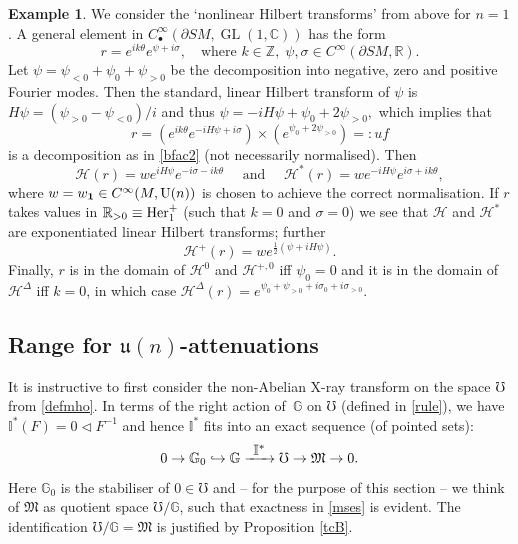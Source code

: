 \documentclass[JEP,XML,SOM,Unicode,published]{cedram}
\newcommand\To[1]{\mathchoice{\xrightarrow{\textstyle\kern4pt#1\kern3pt}}{\stackrel{#1}{\longrightarrow}}{}{}}
\newcommand\hto{\mathrel{\lhook\joinrel\to}}
\DeclareMathOperator{\GL}{GL}
\newcommand{\rU}{\mathrm{U}}
\theoremstyle{plain}
\theoremstyle{definition}
\newtheorem{example}[theorem]{Example}
\newcommand{\G}{\mathbb{G}}
\newcommand{\I}{\mathbb{I}}
\newcommand{\Z}{\mathbb{Z}}
\newcommand{\R}{\mathbb{R}}
\newcommand{\C}{\mathbb{C}}
\renewcommand{\H}{\mathcal{H}}
\newcommand{\M}{\mathfrak{M}}
\renewcommand{\u}{\mathfrak{u}}
\newcommand{\he}{\textup{Her}}
\newcommand{\1}{{\bf 1}}
\newcommand{\extend}{{\scriptscriptstyle\bullet}}
\let\act\triangleleft
\begin{document}
\begin{example} We consider the `nonlinear Hilbert transforms' from above for $n=1$. A general element in $C_\extend^\infty(\partial SM,\GL(1,\C))$ has the form
\begin{equation*}
r = e^{ik\theta} e^{\psi + i\sigma}, \quad\text{where } k\in \Z,\;\psi,\sigma\in C^\infty(\partial SM,\R).
\end{equation*}
Let $\psi=\psi_{<0}+ \psi_0+\psi_{>0}$ be the decomposition into negative, zero and positive Fourier modes. Then the standard, linear Hilbert transform of $\psi$ is
$
H\psi = (\psi_{>0}-\psi_{<0})/i
$
and thus
$
\psi = -iH\psi + \psi_0+2\psi_{>0},
$
which implies that
\begin{equation*}
r = \left(e^{ik \theta} e^{-iH\psi + i\sigma} \right) \times \left(e^{\psi_0+2\psi_{>0}}\right) =: uf
\end{equation*}
is a decomposition as in \eqref{bfac2} (not necessarily normalised). Then
\begin{equation*}
\H(r) = w e^{iH\psi} e^{-i\sigma - ik\theta}\quad \text{ and } \quad \H^*(r) = w e^{-iH\psi}e^{i\sigma + ik\theta},
\end{equation*}
where $w=w_\1\in C^\infty(M,\rU(n))$ is chosen to achieve the correct normalisation.
If $r$ takes values in $\R_{>0}\equiv \he^+_1$ (such that $k=0$ and $\sigma=0$) we see that $\H$ and $\H^*$ are exponentiated linear Hilbert transforms; further
\begin{equation*}
\H^+(r) = w e^{\frac{1}{2}(\psi + i H\psi)}.
\end{equation*}
Finally, $r$ is in the domain of $\H^0$ and $\H^{+,0}$ iff $\psi_0=0$ and it is in the domain of $\H^\Delta$ iff $k=0$, in which case $\H^\Delta(r)=e^{\psi_0+ \psi_{>0}+i\sigma_0 + i \sigma_{>0}}$.
\end{example}

\subsection{Range for $\u(n)$-attenuations} \label{rangeuattenuations}
It is instructive to first consider the non-Abelian X-ray transform on the space $\mho$ from \eqref{defmho}. In terms of the right action of~$\G$ on $\mho$ (defined in \eqref{rule}), we have $\I^*(F)=0\act F^{-1}$ and hence $\I^*$ fits into an exact sequence (of pointed sets):
\begin{equation} \label{mses}
0\to \G_0 \hto \G \To{\I^*} \mho \to \M \to 0.
\end{equation}
Here $\G_0$ is the stabiliser of $0\in \mho$ and -- for the purpose of this section -- we think of $\M$ as quotient space $\mho/\G$, such that exactness in \eqref{mses} is evident. The identification $\mho/\G=\M$ is justified by Proposition \ref{tcB}.
\end{document}
